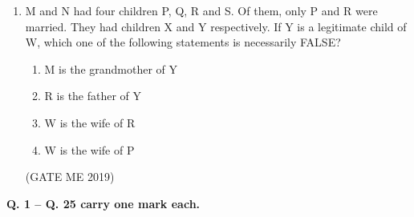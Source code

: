 \documentclass[journal]{IEEEtran}
\begin{document}
\begin{enumerate}
\item M and N had four children P, Q, R and S. Of them, only P and R were married. They had children X and Y respectively. If Y is a legitimate child of W, which one of the following statements is necessarily FALSE?
\begin{enumerate}
    \item M is the grandmother of Y
    \item R is the father of Y
    \item W is the wife of R
    \item W is the wife of P
\end{enumerate}
\hfill (GATE ME 2019)

\end{enumerate}

\textbf{Q. 1 – Q. 25 carry one mark each.}
\end{document}
